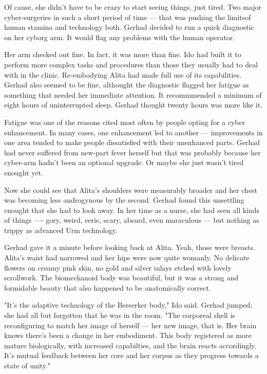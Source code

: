 \documentclass[11pt]{article}
\begin{document}
Of cause, she didn't have to be crazy to start seeing things, just tired. Two major cyber-surgeries in such a short period of time --- that was pushing the limitsof human stamina and technology both. Gerhad decided to run a quick diagnostic on her cyborg arm. It would flag any problems with the human operator.

Her arm checked out fine. In fact, it was more than fine. Ido had built it to perform more complex tasks and procedures than those they usually had to deal with in the clinic. Re-embodying Alita had made full use of its capabilities. Gerhad also seemed to be fine, althought the diagnostic flagged her fatigue as something that needed her immediate attention. It recommmended a minimum of eight hours of uninterrupted sleep. Gerhad thought twenty hours was more like it.

Fatigue was one of the reasons cited most often by people opting for a cyber enhancement. In many cases, one enhancement led to another --- improvements in one area tended to make people dissatisfied with their unenhanced parts. Gerhad had never suffered from new-part fever herself but that was probably because her cyber-arm hadn't been an optional upgrade. Or maybe she just wasn't tired enought yet.

Now she could see that Alita's shoulders were measurably broader and her chest was becoming less androgynous by the second. Gerhad found this unsettling enought that she had to look away. In her time as a nurse, she had seen all kinds of things ---- gory, weird, eerie, scary, absurd, even maraculous --- but nothing as trippy as advanced Urm technology.

Gerhad gave it a minute before looking back at Alita. Yeah, those were breasts. Alita's waist had narrowed and her hips were now quite womanly. No delicate flowers on creamy pink skin, no gold and silver inlays etched with lovely scrollwork. The biomechanoid body was beautiful, but it was a strong and formidable beauty that also happened to be anatomically correct.

"It's the adaptive technology of the Berserker body," Ido said. Gerhad jumped; she had all but forgotten that he was in the room. "The corporeal shell is reconfiguring to match her image of herself --- her new image, that is. Her brain knows there's been a change in her embodiment. This body registered as more mature biologically, with increased capabilties, and the brain reacts accordingly. It's mutual feedback between her core and her corpus as they progress towards a state of unity."
\end{document}
